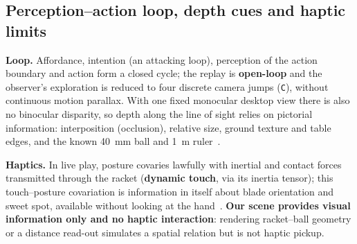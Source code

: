 \subsection{Perception--action loop, depth cues and haptic limits}

\textbf{Loop.} Affordance, intention (an attacking loop), perception of the action boundary and action form a closed cycle; the replay is \textbf{open-loop} and the observer's exploration is reduced to four discrete camera jumps (\texttt{C}), without continuous motion parallax. With one fixed monocular desktop view there is also no binocular disparity, so depth along the line of sight relies on pictorial information: interposition (occlusion), relative size, ground texture and table edges, and the known \SI{40}{\milli\meter} ball and \SI{1}{\meter} ruler~\cite{cutting1995}.

\textbf{Haptics.} In live play, posture covaries lawfully with inertial and contact forces transmitted through the racket (\textbf{dynamic touch}, via its inertia tensor); this touch--posture covariation is information in itself about blade orientation and sweet spot, available without looking at the hand~\cite{gibson1966,turvey1996,kim2026}. \textbf{Our scene provides visual information only and no haptic interaction}: rendering racket--ball geometry or a distance read-out simulates a spatial relation but is not haptic pickup.
